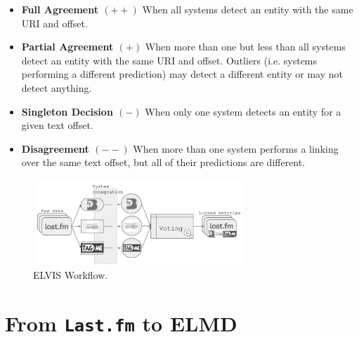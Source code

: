 \begin{itemize}
    \item \textbf{Full Agreement $(++)$} When all systems detect an entity with the same URI and offset.
    \item \textbf{Partial Agreement $(+)$} When more than one but less than all systems detect an entity with the same URI and offset. Outliers (i.e. systems performing a different prediction) may detect a different entity or may not detect anything.
    \item \textbf{Singleton Decision $(-)$} When only one system detects an entity for a given text offset.
    \item \textbf{Disagreement $(--)$} When more than one system performs a linking over the same text offset, but all of their predictions are different.
\end{itemize}



\begin{figure}[h!]
  \centering
	\includegraphics[height=3.25cm,width=8cm]{ch03_linking_pics/workflow_bn.pdf}
  \caption{ELVIS Workflow.}
  \label{fig:linking:workflow}
\end{figure}


\section{From \texttt{Last.fm} to \textsc{ELMD}}
\label{sec:linking:lastfm}

